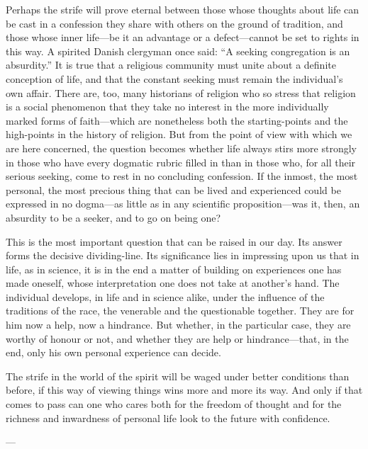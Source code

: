 \documentclass[12pt,a4paper]{article}
\newcommand{\opage}[1]{\marginnote{\footnotesize\textit{[#1]}}}
\begin{document}
Perhaps the strife will prove eternal between those whose thoughts about life can be
cast in a confession they share with others on the ground of tradition, and those whose
inner life---be it an advantage or a defect---cannot be set to rights in this way. A
spirited Danish clergyman once said: ``A seeking congregation is an absurdity.'' It is
true that a religious community must unite about a definite conception of life, and that
the constant seeking must remain the individual's own affair. There are, too, many
historians of religion who so stress that religion is a social phenomenon that they take
no interest in the more individually marked forms of faith---which are nonetheless both
the \opage{59}starting-points and the high-points in the history of religion. But from the point
of view with which we are here concerned, the question becomes whether life always stirs
more strongly in those who have every dogmatic rubric filled in than in those who, for
all their serious seeking, come to rest in no concluding confession. If the inmost, the
most personal, the most precious thing that can be lived and experienced could be
expressed in no dogma---as little as in any scientific proposition---was it, then, an
absurdity to be a seeker, and to go on being one?

This is the most important question that can be raised in our day. Its answer forms the
decisive dividing-line. Its significance lies in impressing upon us that in life, as in
science, it is in the end a matter of building on experiences one has made oneself,
whose interpretation one does not take at another's hand. The individual develops, in
life and in science alike, under the influence of the traditions of the race, the
venerable and the questionable together. They are for him now a help, now a hindrance.
But whether, in the particular case, they are worthy of honour or not, and whether they
are help or hindrance---that, in the end, only his own personal experience can decide.

The strife in the world of the spirit will be waged under better conditions than before,
if this way of viewing things wins more and more its way. And only if that comes to pass
can one who cares both for the freedom of thought and for the richness and inwardness of
personal life look to the future with confidence.

\begin{center}---\end{center}
\end{document}
